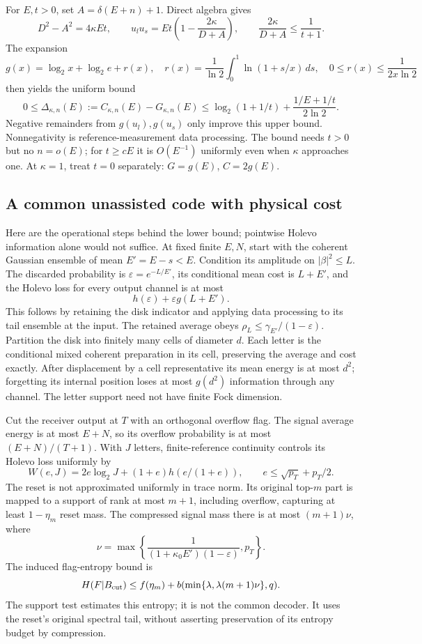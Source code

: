 \documentclass[11pt]{article}
\begin{document}
For \(E,t>0\), set \(A=\delta(E+n)+1\). Direct algebra gives
\[
 D^2-A^2=4\kappa Et,\qquad
 u_lu_s=Et\left(1-\frac{2\kappa}{D+A}\right),\qquad
 \frac{2\kappa}{D+A}\le\frac1{t+1}.
\]
The expansion
\[
 g(x)=\log_2x+\log_2e+r(x),\quad
 r(x)=\frac1{\ln2}\int_0^1\ln(1+s/x)\,ds,\quad
 0\le r(x)\le\frac1{2x\ln2}
\]
then yields the uniform bound
\begin{equation}
 0\le\Delta_{\kappa,n}(E):=C_{\kappa,n}(E)-G_{\kappa,n}(E)
 \le\log_2(1+1/t)+\frac{1/E+1/t}{2\ln2}.   \tag{U2}\label{eq:gapU}
\end{equation}
Negative remainders from \(g(u_l),g(u_s)\) only improve this upper
bound. Nonnegativity is reference-measurement data processing.
The bound needs \(t>0\) but no \(n=o(E)\); for \(t\ge cE\) it is
\(O(E^{-1})\) uniformly even when \(\kappa\) approaches one.
At \(\kappa=1\), treat \(t=0\) separately:
\(G=g(E)\), \(C=2g(E)\).

\subsection{A common unassisted code with physical cost}
Here are the operational steps behind the lower bound; pointwise
Holevo information alone would not suffice. At fixed finite \(E,N\),
start with the coherent Gaussian ensemble of mean \(E'=E-s<E\).
Condition its amplitude on \(|\beta|^2\le L\). The discarded probability
is \(\varepsilon=e^{-L/E'}\), its conditional mean cost is \(L+E'\),
and the Holevo loss for every output channel is at most
\[
 h(\varepsilon)+\varepsilon g(L+E').
\]
This follows by retaining the disk indicator and applying data processing
to its tail ensemble at the input. The retained average obeys
\(\rho_L\le\gamma_{E'}/(1-\varepsilon)\).
Partition the disk into finitely many cells of diameter \(d\).
Each letter is the conditional mixed coherent preparation in its cell,
preserving the average and cost exactly. After displacement by a cell
representative its mean energy is at most \(d^2\); forgetting its internal
position loses at most \(g(d^2)\) information through any channel.
The letter support need not have finite Fock dimension.

Cut the receiver output at \(T\) with an orthogonal overflow flag.
The signal average energy is at most \(E+N\), so its overflow probability
is at most \((E+N)/(T+1)\). With \(J\) letters, finite-reference
continuity \cite[Lemma2]{winter} controls its Holevo loss uniformly by
\[
 W(e,J)=2e\log_2J+(1+e)h(e/(1+e)),\qquad
 e\le\sqrt{p_T}+p_T/2.
\]
The reset is not approximated uniformly in trace norm. Its original
top-\(m\) part is mapped to a support of rank at most \(m+1\), including
overflow, capturing at least \(1-\eta_m\) reset mass. The compressed
signal mass there is at most \((m+1)\nu\), where
\[
 \nu=\max\left\{\frac1{(1+\kappa_0E')(1-\varepsilon)},p_T\right\}.
\]
The induced flag-entropy bound is
\[
 H(F|B_{\rm cut})\le f(\eta_m)
       +b(\min\{\lambda,\lambda(m+1)\nu\},q).
\]
The support test estimates this entropy; it is not the common decoder.
It uses the reset's original spectral tail, without asserting preservation
of its entropy budget by compression.
\end{document}

